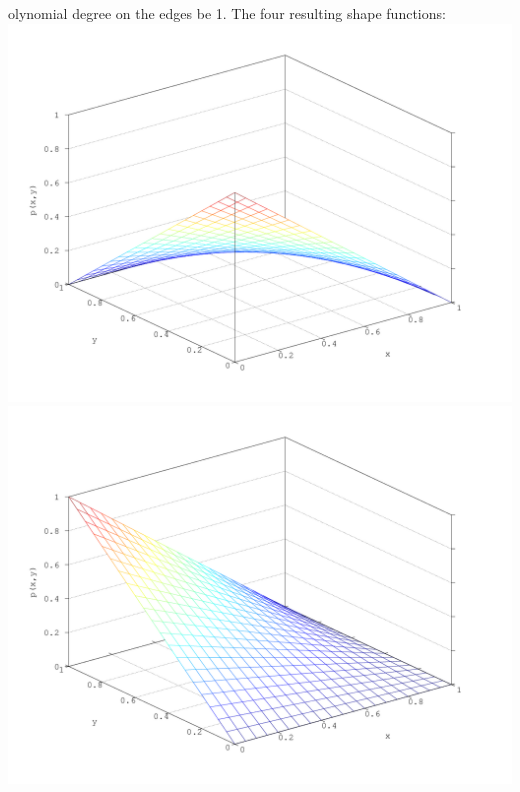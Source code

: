 \documentclass[a4paper,12pt]{article}
\begin{document}
olynomial degree on the edges be 1. The four resulting shape functions:\\
\includegraphics[scale=0.35]{P1} \includegraphics[scale=0.35]{P2} 
\end{document}
